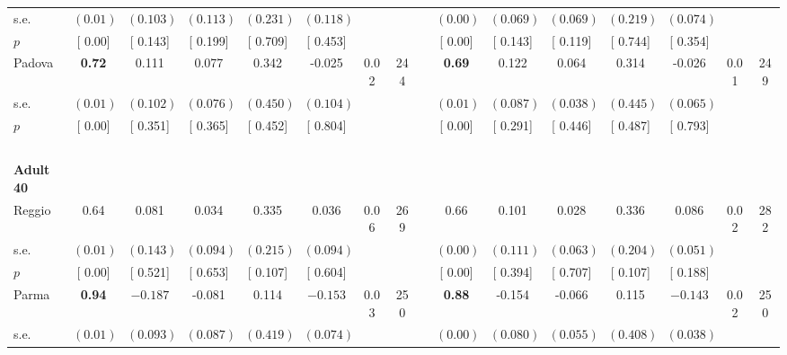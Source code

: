 \begin{longtable}{L{8em} c c c c c c c p{1em} c c c c c c c}
\quad \quad \quad \quad s.e.& $ (     0.01)$ & $ (    0.103)$ & $ (    0.113)$ & $ (    0.231)$ & $ (    0.118)$ & & & & $ (     0.00)$ & $ (    0.069)$ & $ (    0.069)$ & $ (    0.219)$ & $ (    0.074)$ & &  \\*
\quad \quad \quad \quad $ p$ & [     0.00] & [    0.143] & [    0.199] & [    0.709] & [    0.453] & & & & [     0.00] & [    0.143] & [    0.119] & [    0.744] & [    0.354] & &  \\[1em]
\quad \quad \quad Padova& \textbf{     0.72} &     0.111 &     0.077 &     0.342 &    -0.025 &      0.02 &       244 & & \textbf{     0.69} &     0.122 &     0.064 &     0.314 &    -0.026 &      0.01 &       249  \\*
\quad \quad \quad \quad s.e.& $ (     0.01)$ & $ (    0.102)$ & $ (    0.076)$ & $ (    0.450)$ & $ (    0.104)$ & & & & $ (     0.01)$ & $ (    0.087)$ & $ (    0.038)$ & $ (    0.445)$ & $ (    0.065)$ & &  \\*
\quad \quad \quad \quad $ p$ & [     0.00] & [    0.351] & [    0.365] & [    0.452] & [    0.804] & & & & [     0.00] & [    0.291] & [    0.446] & [    0.487] & [    0.793] & &  \\[1em]
~\\[1em]
\quad \quad \textbf{Adult 40} & & & & & & & & & & & & & & & \\* 
\quad \quad \quad Reggio& 0.64 &     0.081 &     0.034 &     0.335 &     0.036 &      0.06 &       269 & & 0.66 &     0.101 &     0.028 &     0.336 &     0.086 &      0.02 &       282  \\*
\quad \quad \quad \quad s.e.& $ (     0.01)$ & $ (    0.143)$ & $ (    0.094)$ & $ (    0.215)$ & $ (    0.094)$ & & & & $ (     0.00)$ & $ (    0.111)$ & $ (    0.063)$ & $ (    0.204)$ & $ (    0.051)$ & &  \\*
\quad \quad \quad \quad $ p$ & [     0.00] & [    0.521] & [    0.653] & [    0.107] & [    0.604] & & & & [     0.00] & [    0.394] & [    0.707] & [    0.107] & [    0.188] & &  \\[1em]
\quad \quad \quad Parma& \textbf{     0.94} & $ \mathbf{   -0.187}$ &    -0.081 &     0.114 & $ \mathbf{   -0.153}$ &      0.03 &       250 & & \textbf{     0.88} &    -0.154 &    -0.066 &     0.115 & $ \mathbf{   -0.143}$ &      0.02 &       250  \\*
\quad \quad \quad \quad s.e.& $ (     0.01)$ & $ (    0.093)$ & $ (    0.087)$ & $ (    0.419)$ & $ (    0.074)$ & & & & $ (     0.00)$ & $ (    0.080)$ & $ (    0.055)$ & $ (    0.408)$ & $ (    0.038)$ & &  \\*

\end{longtable}
